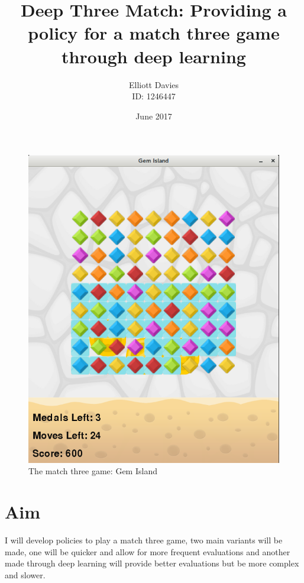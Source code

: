 \documentclass{bhamthesis}
\title{Deep Three Match: Providing a policy for a match three game through deep learning}
\author{Elliott Davies \\ ID: 1246447}
\date{June 2017}  %
\makeatletter
\theoremstyle{definition}
\newcommand{\makecrestcover}{
\begin{titlepage}
\centering\singlespacing
\vspace*{1cm}
{\huge\bfseries University of Birmingham\par}
\vspace*{2cm}
\texttt{[image: media/img/crest]}\par
\vspace*{\stretch{1}}
{\Huge\bfseries
\@author\par
\vspace{1cm}
\@title\par}
\vspace*{\stretch{1}}
{\Large\@date\par}
\end{titlepage}
}
\makeatother
\begin{document}
\frontmatter

\maketitle



\mainmatter

\begin{figure}
\begin{center}
\includegraphics[scale=.3]{media/img/gem_island.png} 
\caption{The match three game: Gem Island}
\label{f.gemisland}
\end{center}
\end{figure}

\section*{Aim}
I will develop policies to play a match three game, two main variants will be made, one will be quicker and allow for more frequent evaluations and another made through deep learning will provide better evaluations but be more complex and slower.
\end{document}
